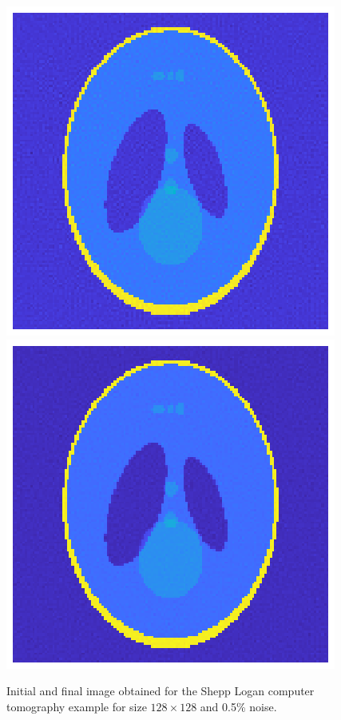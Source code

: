 \begin{figure}[htbp]
\begin{center}
\includegraphics{figures/shepp_logan_initial}\includegraphics{figures/shepp_logan_final}
\caption{Initial and final image obtained for the Shepp Logan computer tomography example for size $128 \times 128$ and 0.5\% noise.}
\label{fig:shepp_logan_initial_and_final}
\end{center}
\end{figure}%

